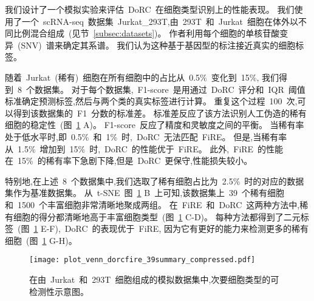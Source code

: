 \label{subsec:recplanted} 
我们设计了一个模拟实验来评估~DoRC~在细胞类型识别上的性能表现。
我们使用了一个~scRNA-seq~数据集~Jurkat\_293T,由~293T~和~Jurkat~细胞在体外以不同比例混合组成~(见节~\ref{subsec:datasets})。
作者利用每个细胞的单核苷酸变异~(SNV)~谱来确定其系谱。
我们认为这种基于基因型的标注接近真实的细胞标签。

随着~Jurkat~(稀有)~细胞在所有细胞中的占比从~0.5\%~变化到~15\%,
我们得到~8~个数据集。
对于每个数据集,~F1-score~是用通过~DoRC~评分和~IQR~阈值标准确定预测标签,然后与两个类的真实标签进行计算。
重复这个过程~100~次,可以得到该数据集的~F1~分数的标准差。
标准差反应了该方法识别人工伪造的稀有细胞的稳定性~(图~\ref{fig:jurkat} A)。 
F1-score~反应了精度和灵敏度之间的平衡。
当稀有率处于低水平时,即~0.5\%~和~1\%~时,~DoRC~无法匹配~FiRE。
但是,当稀有率从~1.5\%~增加到~15\%~时,~DoRC~的性能优于~FiRE。
此外,~FiRE~的性能在~15\%~的稀有率下急剧下降,但是~DoRC~更保守,性能损失较小。

特别地,在上述~8~个数据集中,我们选取了稀有细胞占比为~2.5\%~时的对应的数据集作为基准数据集。
从~t-SNE~图~\ref{fig:jurkat} B~上可知,该数据集上~39~个稀有细胞和~1500~个丰富细胞非常清晰地聚成两组。
在~FiRE~和~DoRC~这两种方法中,稀有细胞的得分都清晰地高于丰富细胞类型~(图~\ref{fig:jurkat} C-D)。
每种方法都得到了二元标签~(图~\ref{fig:jurkat} E-F),~DoRC~的表现优于~FiRE,
因为它有更好的能力来检测更多的稀有细胞~(图~\ref{fig:jurkat} G-H)。

\begin{figure}[!htbp]
    \centering
    \texttt{[image: plot\_venn\_dorcfire\_39summary\_compressed.pdf]}
    \caption{
    在由~Jurkat~和~293T~细胞组成的模拟数据集中,次要细胞类型的可检测性示意图。
    }
    \label{fig:jurkat}
\end{figure}


